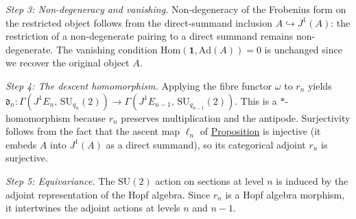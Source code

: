 \begin{lemma}
\emph{Step 3: Non-degeneracy and vanishing.}
Non-degeneracy of the Frobenius form on the restricted object follows from
the direct-summand inclusion $A \hookrightarrow J^1(A)$: the restriction of a
non-degenerate pairing to a direct summand remains non-degenerate.  The
vanishing condition $\mathrm{Hom}(\mathbf{1}, \mathrm{Ad}(A)) = 0$ is
unchanged since we recover the original object $A$.

\emph{Step 4: The descent homomorphism.}
Applying the fibre functor $\omega$ to $r_n$ yields
$\mathfrak{d}_n\colon
\Gamma(J^1 E_n,\, \mathrm{SU}_{q_n}(2)) \to
\Gamma(J^1 E_{n-1},\, \mathrm{SU}_{q_{n-1}}(2))$.
This is a $*$-homomorphism because $r_n$ preserves multiplication and
the antipode.  Surjectivity follows from the fact that the ascent map
$\ell_n$ of \hyperref[prop:jet-prolongation]{Proposition} is injective (it
embeds $A$ into $J^1(A)$ as a direct summand), so its categorical adjoint
$r_n$ is surjective.

\emph{Step 5: Equivariance.}
The $\mathrm{SU}(2)$ action on sections at level $n$ is induced by the
adjoint representation of the Hopf algebra.  Since $r_n$ is a Hopf algebra
morphism, it intertwines the adjoint actions at levels $n$ and $n{-}1$.
\end{lemma}
